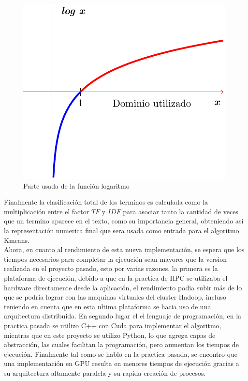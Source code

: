 \documentclass[conference,compsoc]{IEEEtran}
\begin{document}
\begin{figure}[H]
    \includegraphics[scale=1]{LogarithmPos.pdf}
    \caption{Parte usada de la función logaritmo}
    \label{fun:logpos}
\end{figure}

Finalmente la clasificación total de los terminos es calculada como la multiplicación
entre el factor $TF$ y $IDF$ para asociar tanto la cantidad de veces que un termino
aparece en el texto, como su importancia general, obteniendo así la representación
numerica final que sera usada como entrada para el algoritmo Kmeans.\\

Ahora, en cuanto al rendimiento de esta nueva implementación, se espera que
los tiempos necesarios para completar la ejecución sean mayores que la version realizada
en el proyecto pasado, esto por varias razones, la primera es la plataforma de ejecución,
debido a que en la practica de HPC se utilizaba el hardware directamente desde
la aplicación, el rendimiento podia subir más de lo que se podria lograr con las
maquinas virtuales del cluster Hadoop, incluso teniendo en cuenta que en esta
ultima plataforma se hacia uso de una arquitectura distribuida. En segundo lugar
el el lenguaje de programación, en la practica pasada se utilizo C++ con Cuda para
implementar el algoritmo, mientras que en este proyecto se utilizo Python, lo que
agrega capas de abstracción, las cuales facilitan la programación, pero aumentan
los tiempos de ejecución. Finalmente tal como se hablo en la practica pasada,
se encontro que una implementación en GPU resulta en menores tiempos de ejecución
gracias a su arquitectura altamente paralela y su rapida creación de procesos.\\
\end{document}
